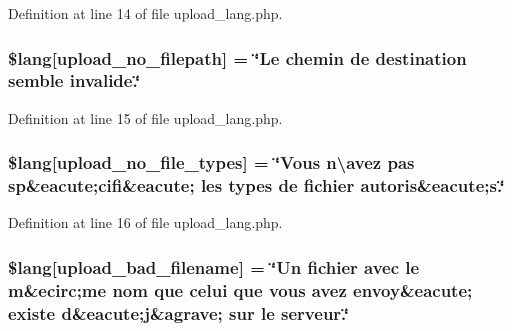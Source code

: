Definition at line 14 of file upload\+\_\+lang.\+php.

\subsubsection[{\texorpdfstring{\$lang}{$lang}}]{\setlength{\rightskip}{0pt plus 5cm}\$lang\mbox{[}\textquotesingle{}upload\+\_\+no\+\_\+filepath\textquotesingle{}\mbox{]} = \char`\"{}Le chemin de destination semble invalide.\char`\"{}}\hypertarget{application_2language_2french_2upload__lang_8php_a3c17908c53072c6a5ef593760aaaa704}{}\label{application_2language_2french_2upload__lang_8php_a3c17908c53072c6a5ef593760aaaa704}


Definition at line 15 of file upload\+\_\+lang.\+php.

\subsubsection[{\texorpdfstring{\$lang}{$lang}}]{\setlength{\rightskip}{0pt plus 5cm}\$lang\mbox{[}\textquotesingle{}upload\+\_\+no\+\_\+file\+\_\+types\textquotesingle{}\mbox{]} = \char`\"{}Vous n\textbackslash{}\textquotesingle{}avez pas sp\&eacute;cifi\&eacute; les {\bf types} de fichier autoris\&eacute;s.\char`\"{}}\hypertarget{application_2language_2french_2upload__lang_8php_ab188c98e583c81905dedaad54ad452bb}{}\label{application_2language_2french_2upload__lang_8php_ab188c98e583c81905dedaad54ad452bb}


Definition at line 16 of file upload\+\_\+lang.\+php.

\subsubsection[{\texorpdfstring{\$lang}{$lang}}]{\setlength{\rightskip}{0pt plus 5cm}\$lang\mbox{[}\textquotesingle{}upload\+\_\+bad\+\_\+filename\textquotesingle{}\mbox{]} = \char`\"{}Un fichier avec le {\bf m}\&ecirc;me nom que celui que vous avez envoy\&eacute; existe {\bf d}\&eacute;j\&agrave; sur le serveur.\char`\"{}}\hypertarget{application_2language_2french_2upload__lang_8php_abb379322384f3f35952a539c63e2c8f7}{}\label{application_2language_2french_2upload__lang_8php_abb379322384f3f35952a539c63e2c8f7}


